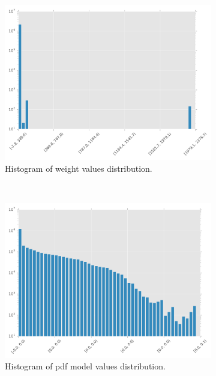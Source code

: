 \documentclass[final]{article}
\begin{document}
\begin{figure}[H]
\centering
    \begin{subfigure}[b]{0.32\textwidth}
        \centering
        \includegraphics[width=\textwidth]{resources/histogramC}
        \caption{Histogram of weight values distribution.}
    \end{subfigure}%
    ~
    \begin{subfigure}[b]{0.32\textwidth}
        \centering
        \includegraphics[width=\textwidth]{resources/histogramp}
        \caption{Histogram of pdf model values distribution.}
    \end{subfigure}
    ~
    \begin{subfigure}[b]{0.32\textwidth}
        \centering

\end{subfigure}
\end{figure}
\end{document}
